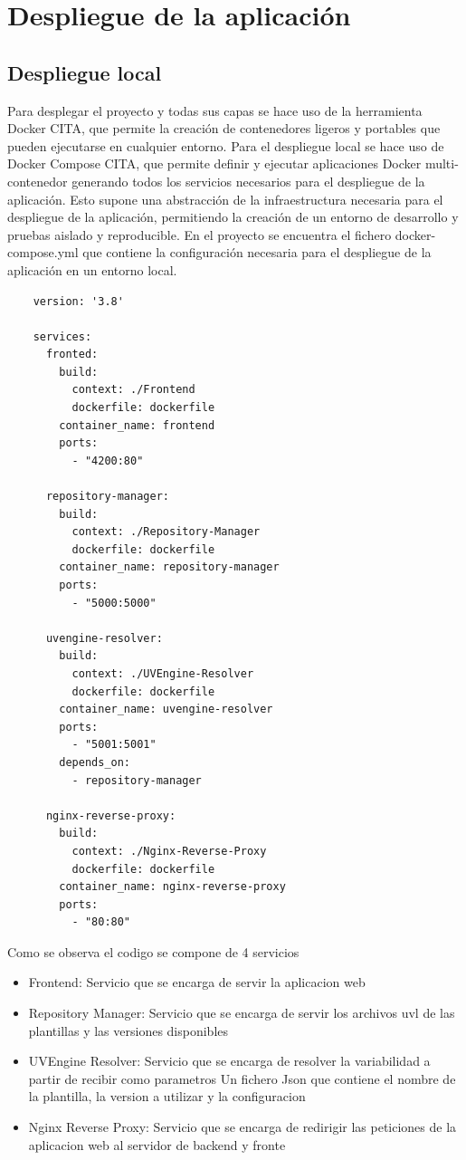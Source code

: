 \documentclass[12pt, a4paper, twoside]{article}
\begin{document}
\section{Despliegue de la aplicación }
\subsection{ Despliegue local }
Para desplegar el proyecto y todas sus capas se hace uso de la herramienta Docker CITA, que permite la creación de contenedores ligeros y portables que pueden ejecutarse en cualquier entorno.
Para el despliegue local se hace uso de Docker Compose CITA, que permite definir y ejecutar aplicaciones Docker multi-contenedor generando todos los servicios necesarios para el despliegue de la aplicación.
Esto supone una abstracción de la infraestructura necesaria para el despliegue de la aplicación, permitiendo la creación de un entorno de desarrollo y pruebas aislado y reproducible.
En el proyecto se encuentra el fichero docker-compose.yml que contiene la configuración necesaria para el despliegue de la aplicación en un entorno local.
\begin{verbatim}
	version: '3.8'

	services:
	  fronted:
		build:
		  context: ./Frontend
		  dockerfile: dockerfile
		container_name: frontend
		ports:
		  - "4200:80"
	  
	  repository-manager:
		build:
		  context: ./Repository-Manager
		  dockerfile: dockerfile
		container_name: repository-manager
		ports:
		  - "5000:5000"
	
	  uvengine-resolver:
		build:
		  context: ./UVEngine-Resolver
		  dockerfile: dockerfile
		container_name: uvengine-resolver
		ports:
		  - "5001:5001"
		depends_on:
		  - repository-manager
	  
	  nginx-reverse-proxy:
		build:
		  context: ./Nginx-Reverse-Proxy
		  dockerfile: dockerfile
		container_name: nginx-reverse-proxy
		ports:
		  - "80:80"
	\end{verbatim}

Como se observa el codigo se compone de 4 servicios 
\begin{itemize}
	\item Frontend: Servicio que se encarga de servir la aplicacion web
	\item Repository Manager: Servicio que se encarga de servir los archivos uvl de las plantillas y las versiones disponibles
	\item UVEngine Resolver: Servicio que se encarga de resolver la variabilidad a partir de recibir como parametros Un fichero Json que contiene el nombre de la plantilla, la version a utilizar y la configuracion 
	\item Nginx Reverse Proxy: Servicio que se encarga de redirigir las peticiones de la aplicacion web al servidor de backend y fronte	
\end{itemize}
\end{document}
